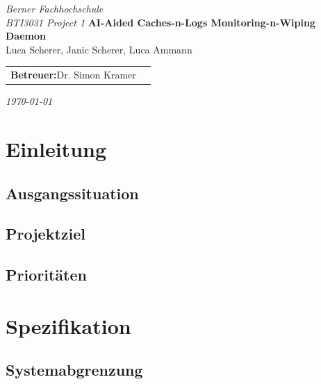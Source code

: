 \documentclass[a4paper,12pt]{report}
\begin{document}
    \begin{titlepage}
        \centering
        \textit{Berner Fachhochschule}\\[0.2em]
        \textit{BTI3031 Project 1}
        \vfill
        {\huge \textbf{AI-Aided Caches-n-Logs Monitoring-n-Wiping Daemon}}\\[4em]
        {\large Luca Scherer, Janic Scherer, Luca Ammann }\\[0.5em]
        \begin{tabular}{ll}
        \textbf{Betreuer:}\hspace{0.5em}Dr. Simon Kramer \\
        \end{tabular}

        \vfill
        \textit{\today}
    \end{titlepage}

    \begin{abstract}
        \ldots
    \end{abstract}

    \tableofcontents
    \listoftables
    \listoffigures
    \lstlistoflistings



    \chapter{Einleitung}


    \section{Ausgangssituation}


    \section{Projektziel}


    \section{Prioritäten}


    \chapter{Spezifikation}

    \newpage
    \section{Systemabgrenzung}
\end{document}
